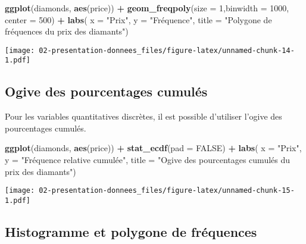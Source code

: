 \documentclass[]{book}
\newenvironment{Shaded}{\begin{snugshade}}{\end{snugshade}}
\newcommand{\KeywordTok}[1]{\textcolor[rgb]{0.13,0.29,0.53}{\textbf{#1}}}
\newcommand{\DataTypeTok}[1]{\textcolor[rgb]{0.13,0.29,0.53}{#1}}
\newcommand{\DecValTok}[1]{\textcolor[rgb]{0.00,0.00,0.81}{#1}}
\newcommand{\StringTok}[1]{\textcolor[rgb]{0.31,0.60,0.02}{#1}}
\newcommand{\OtherTok}[1]{\textcolor[rgb]{0.56,0.35,0.01}{#1}}
\newcommand{\OperatorTok}[1]{\textcolor[rgb]{0.81,0.36,0.00}{\textbf{#1}}}
\newcommand{\NormalTok}[1]{#1}
\begin{document}
\begin{Shaded}
\begin{Highlighting}[]
\KeywordTok{ggplot}\NormalTok{(diamonds, }\KeywordTok{aes}\NormalTok{(price)) }\OperatorTok{+}\StringTok{ }
\StringTok{  }\KeywordTok{geom_freqpoly}\NormalTok{(}\DataTypeTok{size =} \DecValTok{1}\NormalTok{,}\DataTypeTok{binwidth =} \DecValTok{1000}\NormalTok{, }\DataTypeTok{center =} \DecValTok{500}\NormalTok{) }\OperatorTok{+}\StringTok{ }
\StringTok{  }\KeywordTok{labs}\NormalTok{(}
    \DataTypeTok{x =} \StringTok{"Prix"}\NormalTok{, }
    \DataTypeTok{y =} \StringTok{"Fréquence"}\NormalTok{, }
    \DataTypeTok{title =} \StringTok{"Polygone de fréquences du prix des diamants"}\NormalTok{)}
\end{Highlighting}
\end{Shaded}

\texttt{[image: 02-presentation-donnees\_files/figure-latex/unnamed-chunk-14-1.pdf]}

\subsection{Ogive des pourcentages
cumulés}\label{ogive-des-pourcentages-cumules}

Pour les variables quantitatives discrètes, il est possible d'utiliser
l'ogive des pourcentages cumulés.

\begin{Shaded}
\begin{Highlighting}[]
\KeywordTok{ggplot}\NormalTok{(diamonds, }\KeywordTok{aes}\NormalTok{(price)) }\OperatorTok{+}\StringTok{ }
\StringTok{  }\KeywordTok{stat_ecdf}\NormalTok{(}\DataTypeTok{pad =} \OtherTok{FALSE}\NormalTok{) }\OperatorTok{+}\StringTok{ }
\StringTok{  }\KeywordTok{labs}\NormalTok{(}
    \DataTypeTok{x =} \StringTok{"Prix"}\NormalTok{, }
    \DataTypeTok{y =} \StringTok{"Fréquence relative cumulée"}\NormalTok{, }
    \DataTypeTok{title =} \StringTok{"Ogive des pourcentages cumulés du prix des diamants"}\NormalTok{)}
\end{Highlighting}
\end{Shaded}

\texttt{[image: 02-presentation-donnees\_files/figure-latex/unnamed-chunk-15-1.pdf]}

\subsection{Histogramme et polygone de
fréquences}\label{histogramme-et-polygone-de-frequences}
\end{document}
